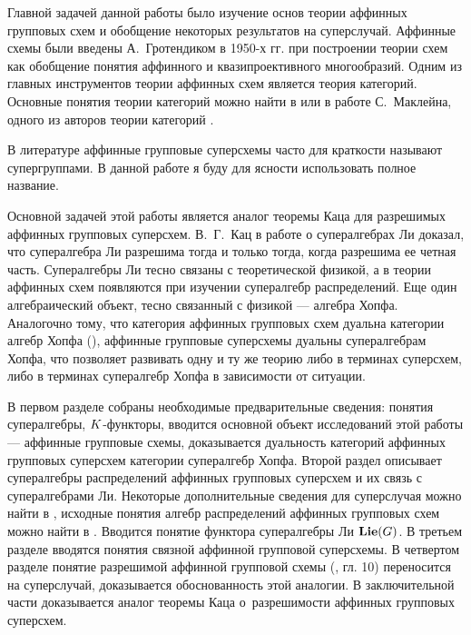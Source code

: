 Главной задачей данной работы было изучение основ теории аффинных групповых
схем и обобщение некоторых результатов на суперслучай.
Аффинные схемы были введены А.~Гротендиком в 1950-х гг. при построении теории схем
как обобщение понятия аффинного и квазипроективного многообразий.
Одним из главных инструментов теории аффинных схем является теория категорий.
Основные понятия теории категорий можно найти в \cite{category_introduction}
или в работе С.~Маклейна, одного из авторов теории категорий \cite{mclane}.

В литературе аффинные групповые суперсхемы часто для краткости
называют супергруппами. В данной работе я буду для ясности использовать полное название.

Основной задачей этой работы является аналог теоремы Каца
для разрешимых аффинных групповых суперсхем. В.~Г.~Кац в работе \cite{kac}
о супералгебрах Ли доказал, что супералгебра Ли разрешима тогда и только тогда,
когда разрешима ее четная часть. Супералгебры Ли тесно связаны с теоретической
физикой, а в теории аффинных схем появляются при изучении супералгебр распределений.
Еще один алгебраический объект, тесно связанный с физикой --- алгебра Хопфа.
Аналогочно тому, что категория аффинных групповых схем дуальна категории алгебр Хопфа
(\cite{waterhouse}), аффинные групповые суперсхемы дуальны супералгебрам Хопфа,
что позволяет развивать одну и ту же теорию либо в терминах суперсхем,
либо в терминах супералгебр Хопфа в зависимости от ситуации.

%
В первом разделе собраны необходимые предварительные сведения: 
понятия супералгебры, $K$-функторы,
вводится основной объект исследований этой работы --- аффинные групповые схемы,
доказывается дуальность категорий аффинных групповых суперсхем
категории супералгебр Хопфа.
%
Второй раздел описывает супералгебры распределений аффинных групповых суперсхем
и их связь с супералгебрами Ли. Некоторые дополнительные сведения для суперслучая
можно найти в \cite{affine_quotients}, исходные понятия алгебр распределений
аффинных групповых схем можно найти в \cite{waterhouse}.
Вводится понятие функтора супералгебры Ли $ \mathbf{Lie}(G) $.
%
В третьем разделе вводятся понятия связной аффинной групповой суперсхемы.
%
В четвертом разделе понятие разрешимой аффинной групповой схемы
(\cite{waterhouse}, гл. 10) переносится на суперслучай, доказывается
обоснованность этой аналогии.
%
В заключительной части доказывается аналог теоремы Каца о~разрешимости
аффинных групповых суперсхем.